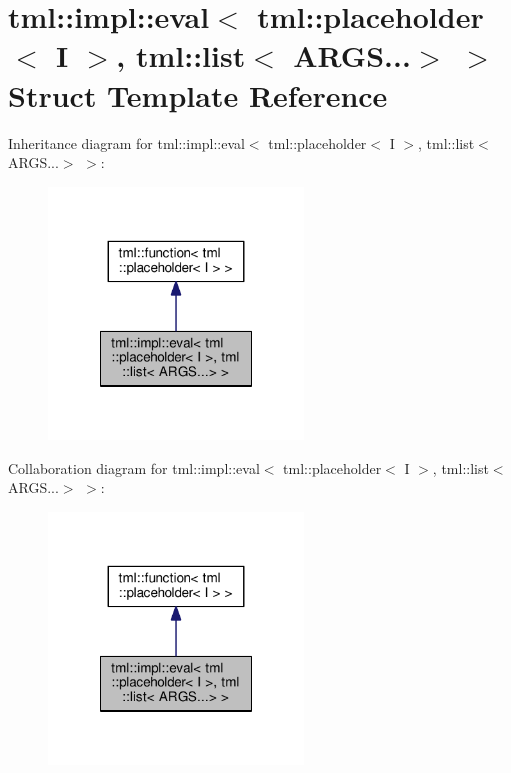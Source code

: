 \hypertarget{structtml_1_1impl_1_1eval_3_01tml_1_1placeholder_3_01_i_01_4_00_01tml_1_1list_3_01_a_r_g_s_8_8_8_4_01_4}{\section{tml\+:\+:impl\+:\+:eval$<$ tml\+:\+:placeholder$<$ I $>$, tml\+:\+:list$<$ A\+R\+G\+S...$>$ $>$ Struct Template Reference}
\label{structtml_1_1impl_1_1eval_3_01tml_1_1placeholder_3_01_i_01_4_00_01tml_1_1list_3_01_a_r_g_s_8_8_8_4_01_4}
}


Inheritance diagram for tml\+:\+:impl\+:\+:eval$<$ tml\+:\+:placeholder$<$ I $>$, tml\+:\+:list$<$ A\+R\+G\+S...$>$ $>$\+:
\nopagebreak
\begin{figure}[H]
\begin{center}
\leavevmode
\includegraphics[width=192pt]{structtml_1_1impl_1_1eval_3_01tml_1_1placeholder_3_01_i_01_4_00_01tml_1_1list_3_01_a_r_g_s_8_8_8_4_01_4__inherit__graph}
\end{center}
\end{figure}


Collaboration diagram for tml\+:\+:impl\+:\+:eval$<$ tml\+:\+:placeholder$<$ I $>$, tml\+:\+:list$<$ A\+R\+G\+S...$>$ $>$\+:
\nopagebreak
\begin{figure}[H]
\begin{center}
\leavevmode
\includegraphics[width=192pt]{structtml_1_1impl_1_1eval_3_01tml_1_1placeholder_3_01_i_01_4_00_01tml_1_1list_3_01_a_r_g_s_8_8_8_4_01_4__coll__graph}
\end{center}
\end{figure}
